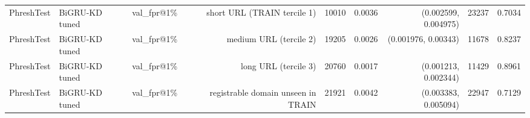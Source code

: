 \begin{table}[t]
\begin{tabular}{llrrrrrrr}
PhreshTest & BiGRU-KD tuned & val\_fpr@1\% & short URL (TRAIN tercile 1) & 10010 & 0.0036 & (0.002599, 0.004975) & 23237 & 0.7034 \\
PhreshTest & BiGRU-KD tuned & val\_fpr@1\% & medium URL (tercile 2) & 19205 & 0.0026 & (0.001976, 0.00343) & 11678 & 0.8237 \\
PhreshTest & BiGRU-KD tuned & val\_fpr@1\% & long URL (tercile 3) & 20760 & 0.0017 & (0.001213, 0.002344) & 11429 & 0.8961 \\
PhreshTest & BiGRU-KD tuned & val\_fpr@1\% & registrable domain unseen in TRAIN & 21921 & 0.0042 & (0.003383, 0.005094) & 22947 & 0.7129 \\
\bottomrule
\end{tabular}
\end{table}